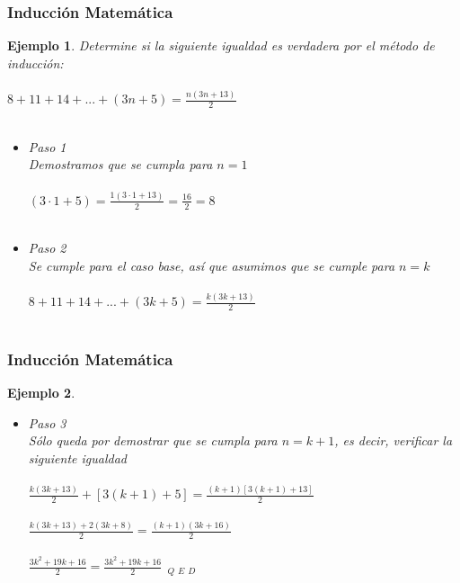 \documentclass[11pt]{beamer}
\newtheorem{ejem}{Ejemplo}
\begin{document}
\begin{frame}
\frametitle{Inducción Matemática}
\begin{ejem}
Determine si la siguiente igualdad es verdadera por el método de inducción:\\ \hspace{0cm} \\
$8 + 11 + 14 + ... + (3n + 5) = \frac{n(3n + 13)}{2}$\\ \hspace{0cm} \\
\begin{itemize}
\item Paso 1\\
Demostramos que se cumpla para $n = 1$\\ \hspace{0cm} \\
$(3\cdot1 + 5) = \frac{1(3\cdot1 + 13)}{2} = \frac{16}{2} = 8$\\ \hspace{0cm} \\
\item Paso 2\\
Se cumple para el caso base, así que asumimos que se cumple para $n = k$\\ \hspace{0cm} \\
$8 + 11 + 14 + ... + (3k + 5) = \frac{k(3k + 13)}{2}$\\ \hspace{0cm} \\
\end{itemize}
\end{ejem}
\end{frame}

\begin{frame}
\frametitle{Inducción Matemática}
\begin{ejem}
\begin{itemize}
\item Paso 3\\
Sólo queda por demostrar que se cumpla para $n = k+1$, es decir, verificar la siguiente igualdad\\ \hspace{0cm} \\
$\frac{k(3k + 13)}{2} + [3(k+1)+5] = \frac{(k+1)[3(k+1) + 13]}{2}$\\ \hspace{0cm} \\
$\frac{k(3k + 13)+2(3k+8)}{2} = \frac{(k+1)(3k+16)}{2}$\\ \hspace{0cm} \\
$\frac{3k^2+19k+16}{2} = \frac{3k^2+19k+16}{2} ~ ~ _Q ~ _E ~ _D$\\ \hspace{0cm} \\
\end{itemize}
\end{ejem}
\end{frame}
\end{document}
